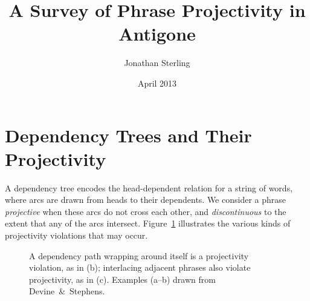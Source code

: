 \documentclass{article}
\begin{document}
\setmainfont{Times New Roman}

\author{Jonathan Sterling}

\title{A Survey of Phrase Projectivity in Antigone}
\date{April 2013}
\maketitle



\section{Dependency Trees and Their Projectivity}

A dependency tree encodes the head-dependent relation for a string of words,
where arcs are drawn from heads to their dependents. We consider a phrase
\emph{projective} when these arcs do not cross each other, and
\emph{discontinuous} to the extent that any of the arcs intersect.
Figure~\ref{fig:dependency-trees} illustrates the various kinds of projectivity
violations that may occur.

\begin{figure}[h!]
\centering
{}
\hspace{6pt}

\caption{A dependency path wrapping around itself is a projectivity violation,
as in (b); interlacing adjacent phrases also violate projectivity, as in
(c). Examples (a--b) drawn from Devine~\&~Stephens.}
\label{fig:dependency-trees}
\end{figure}
\end{document}

